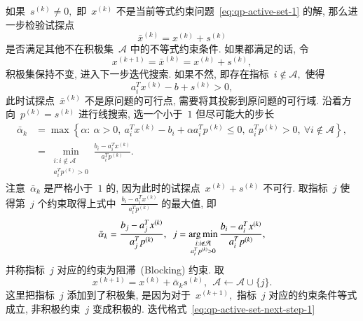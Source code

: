 如果~${s}^{(k)} \neq {0},$ 即~${x}^{(k)}$ 不是当前等式约束问题~\eqref{eq:qp-active-set-1} 的解, 那么进一步检验试探点
\begin{equation}
\label{eq:qp-active-set-test-point}
\bar{{x}}^{(k)} = {x}^{(k)} + {s}^{(k)}
\end{equation}
是否满足其他不在积极集~$\mathcal{A}$ 中的不等式约束条件. 如果都满足的话, 令
\begin{equation}
\label{eq:qp-active-set-next-step-1}
{x}^{(k+1)} = \bar{{x}}^{(k)} = {x}^{(k)} + {s}^{(k)},
\end{equation}
积极集保持不变, 进入下一步迭代搜索. 如果不然, 即存在指标~$i \not\in \mathcal{A},$ 使得
\begin{equation*}
{a}_i^T {x}^{(k)} - {b} + {s}^{(k)} > 0,
\end{equation*}
此时试探点~$\bar{{x}}^{(k)}$ 不是原问题的可行点, 需要将其投影到原问题的可行域.
沿着方向~${p}^{(k)} = {s}^{(k)}$ 进行线搜索, 选一个小于~$1$ 但尽可能大的步长
\begin{equation}
\label{eq:qp-active-set-step-len-1}
\begin{aligned}
\bar{\alpha}_k & = \max \left\{ \alpha : ~ \alpha > 0, ~ {a}_i^T {x}^{(k)} - b_i + \alpha {a}_i^T {p}^{(k)} \leqslant 0, ~ {a}_i^T {p}^{(k)} > 0, ~ \forall i \not\in \mathcal{A} \right\}, \\
& = \min_{\substack{i: i \not\in \mathcal{A} \\ {a}_i^T {p}^{(k)} > 0}} \frac{b_i - {a}_i^T {x}^{(k)}}{{a}_i^T {p}^{(k)}}.
\end{aligned}
\end{equation}
注意~$\bar{\alpha}_k$ 是严格小于~$1$ 的, 因为此时的试探点~${x}^{(k)} + {s}^{(k)}$ 不可行. 取指标~$j$ 使得第~$j$ 个约束取得上式中~$\frac{b_i - {a}_i^T {x}^{(k)}}{{a}_i^T {p}^{(k)}}$ 的最大值, 即
\begin{equation}
\label{eq:qp-active-set-step-len-2}
\bar{\alpha}_k = \frac{b_j - {a}_j^T {x}^{(k)}}{{a}_j^T {p}^{(k)}}, ~~ j = \operatorname*{arg\,min}_{\substack{i: i \not\in \mathcal{A} \\ {a}_i^T {p}^{(k)} > 0}} \frac{b_i - {a}_i^T {x}^{(k)}}{{a}_i^T {p}^{(k)}},
\end{equation}
并称指标~$j$ 对应的约束为阻滞~(Blocking) 约束. 取
\begin{equation}
\label{eq:qp-active-set-next-step-2}
{x}^{(k+1)} = {x}^{(k)} + \bar{\alpha}_k {s}^{(k)}, ~~ \mathcal{A} \gets \mathcal{A} \cup \{ j \}.
\end{equation}
这里把指标~$j$ 添加到了积极集, 是因为对于~${x}^{(k+1)},$ 指标~$j$ 对应的约束条件等式成立, 非积极约束~$j$ 变成积极的. 迭代格式~\eqref{eq:qp-active-set-next-step-1}
